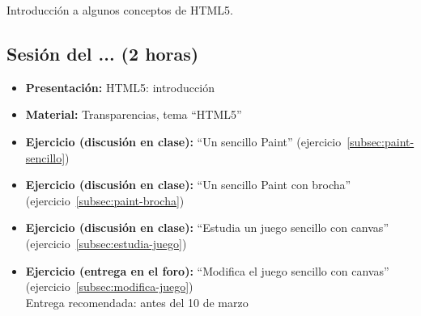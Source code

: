 \documentclass[a4paper,12pt]{report}
\begin{document}
Introducción a algunos conceptos de HTML5.

\subsection{Sesión del ... (2 horas)}

\begin{itemize}
 \item \textbf{Presentación:} HTML5: introducción
 \item \textbf{Material:} Transparencias, tema ``HTML5''


 \item \textbf{Ejercicio (discusión en clase):} ``Un sencillo Paint'' (ejercicio~\ref{subsec:paint-sencillo})
 \item \textbf{Ejercicio (discusión en clase):} ``Un sencillo Paint con brocha'' (ejercicio~\ref{subsec:paint-brocha}) \\
 \item \textbf{Ejercicio (discusión en clase):} ``Estudia un juego sencillo con canvas'' (ejercicio~\ref{subsec:estudia-juego})
 \item \textbf{Ejercicio (entrega en el foro):} ``Modifica el juego sencillo con canvas'' (ejercicio~\ref{subsec:modifica-juego}) \\
   Entrega recomendada: antes del 10 de marzo
\end{itemize}
\end{document}
